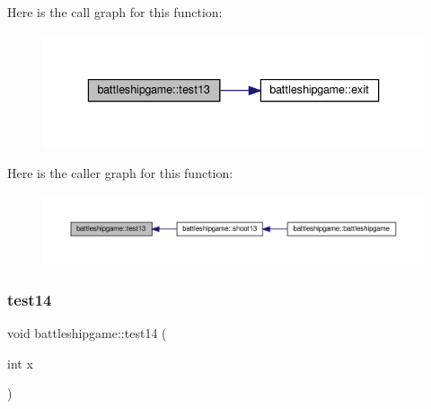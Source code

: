 Here is the call graph for this function\+:
\nopagebreak
\begin{figure}[H]
\begin{center}
\leavevmode
\includegraphics[width=336pt]{classbattleshipgame_a2b71aca6916fc24986574cc5282cc6b1_cgraph}
\end{center}
\end{figure}
Here is the caller graph for this function\+:
\nopagebreak
\begin{figure}[H]
\begin{center}
\leavevmode
\includegraphics[width=350pt]{classbattleshipgame_a2b71aca6916fc24986574cc5282cc6b1_icgraph}
\end{center}
\end{figure}
\mbox{\label{classbattleshipgame_a038c75b53a7aeb63718718ddb474d6f9}} 
\subsubsection{\texorpdfstring{test14}{test14}}
{\footnotesize\ttfamily void battleshipgame\+::test14 (\begin{DoxyParamCaption}\item[{int}]{x }\end{DoxyParamCaption})\hspace{0.3cm}{\ttfamily [slot]}}

